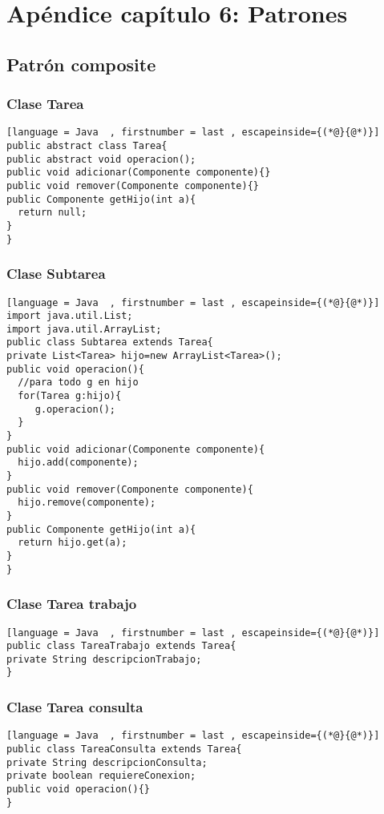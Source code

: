 \appendix
\chapter{Apéndice capítulo 6: Patrones}


\section{Patrón composite}

\subsection{Clase Tarea}
\begin{lstlisting}[language = Java  , firstnumber = last , escapeinside={(*@}{@*)}]
public abstract class Tarea{
public abstract void operacion();
public void adicionar(Componente componente){}
public void remover(Componente componente){}
public Componente getHijo(int a){
  return null;
}
}
\end{lstlisting}

\subsection{Clase Subtarea}
\begin{lstlisting}[language = Java  , firstnumber = last , escapeinside={(*@}{@*)}]
import java.util.List;
import java.util.ArrayList;
public class Subtarea extends Tarea{
private List<Tarea> hijo=new ArrayList<Tarea>();
public void operacion(){
  //para todo g en hijo
  for(Tarea g:hijo){
     g.operacion();
  }
}
public void adicionar(Componente componente){
  hijo.add(componente);
}
public void remover(Componente componente){
  hijo.remove(componente);
}
public Componente getHijo(int a){
  return hijo.get(a);
}
}
\end{lstlisting}

\subsection{Clase Tarea trabajo}
\begin{lstlisting}[language = Java  , firstnumber = last , escapeinside={(*@}{@*)}]
public class TareaTrabajo extends Tarea{
private String descripcionTrabajo;
}
\end{lstlisting}

\subsection{Clase Tarea consulta}
\begin{lstlisting}[language = Java  , firstnumber = last , escapeinside={(*@}{@*)}]
public class TareaConsulta extends Tarea{
private String descripcionConsulta;
private boolean requiereConexion;
public void operacion(){}
}
\end{lstlisting}

